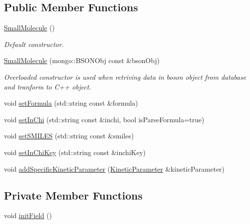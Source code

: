 \subsection*{Public Member Functions}
\begin{DoxyCompactItemize}
\item 
\hyperlink{classunisys_1_1SmallMolecule_af34d41b9aa45a534637f191410b08f16}{Small\-Molecule} ()
\begin{DoxyCompactList}\small\item\em Default constructor. \end{DoxyCompactList}\item 
\hyperlink{classunisys_1_1SmallMolecule_a83a5145dce173f6f9e7a8f4de6cad535}{Small\-Molecule} (mongo\-::\-B\-S\-O\-N\-Obj const \&bson\-Obj)
\begin{DoxyCompactList}\small\item\em Overloaded constructor is used when retriving data in boson object from database and tranform to C++ object. \end{DoxyCompactList}\item 
void \hyperlink{classunisys_1_1SmallMolecule_a6e2b4b37f35d57eeb23dec89a8f5f56a}{set\-Formula} (std\-::string const \&formula)
\item 
void \hyperlink{classunisys_1_1SmallMolecule_a0f8844ca6f7366c9b980c505b76740f6}{set\-In\-Chi} (std\-::string const \&inchi, bool is\-Parse\-Formula=true)
\item 
void \hyperlink{classunisys_1_1SmallMolecule_a99bcb02a50269eda30f44ad997311dd0}{set\-S\-M\-I\-L\-E\-S} (std\-::string const \&smiles)
\item 
void \hyperlink{classunisys_1_1SmallMolecule_a5ebecf5cb6e2afd628647aeaefb08791}{set\-In\-Chi\-Key} (std\-::string const \&inchi\-Key)
\item 
void \hyperlink{classunisys_1_1SmallMolecule_ab73c0c7b1e2f35b0675539e39bce7193}{add\-Specific\-Kinetic\-Parameter} (\hyperlink{classunisys_1_1KineticParameter}{Kinetic\-Parameter} \&kinetic\-Parameter)
\end{DoxyCompactItemize}
\subsection*{Private Member Functions}
\begin{DoxyCompactItemize}
\item 
void \hyperlink{classunisys_1_1SmallMolecule_a0f0da371544569163782603ace820d0a}{init\-Field} ()
\end{DoxyCompactItemize}

